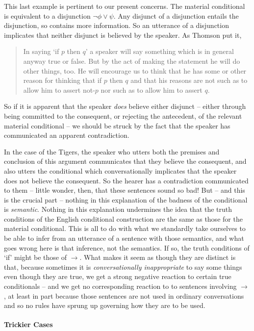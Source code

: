 This last example is pertinent to our present concerns. The material conditional is equivalent to a disjunction $\neg \phi \vee \psi$. Any disjunct of a disjunction entails the disjunction, so contains more information. So an utterance of a disjunction implicates that neither disjunct is believed by the speaker. As Thomson put it, \begin{quote}
	In saying ‘if $p$ then $q$’ a speaker will say something which is in general anyway true or false. But by the act of making the statement he will do other things, too. He will encourage us to think that he has some or other reason for thinking that if $p$ then $q$ and that his reasons are not such as to allow him to assert not-$p$ nor such as to allow him to assert $q$. \citep[67–8]{thomson}
\end{quote} So if it is apparent that the speaker \emph{does} believe either disjunct – either through being committed to the consequent, or rejecting the antecedent, of the relevant material conditional – we should be struck by the fact that the speaker has communicated an apparent contradiction. 


In the case of the Tigers, the speaker who utters both the premises and conclusion of this argument communicates that they believe the consequent, and also utters the conditional which conversationally implicates that the speaker does not believe the consequent. So the hearer has a contradiction communicated to them – little wonder, then, that these sentences sound so bad! But – and this is the crucial part – nothing in this explanation of the badness of the conditional is \emph{semantic}. Nothing in this explanation undermines the idea that the truth conditions of the English conditional construction are the same as those for the material conditional. This is all to do with what we standardly take ourselves to be able to infer from an utterance of a sentence with those semantics, and what goes wrong here is that inference, not the semantics. If so, the truth conditions of `if' might be those of $\to$. What makes it seem as though they are distinct is that, because sometimes it is \emph{conversationally inappropriate} to say some things even though they are true, we get a strong negative reaction to certain true conditionals – and we get no corresponding reaction to to sentences involving $\to$, at least in part because those sentences are not used in ordinary conversations and so no rules have sprung up governing how they are to be used.

\paragraph{Trickier Cases}


